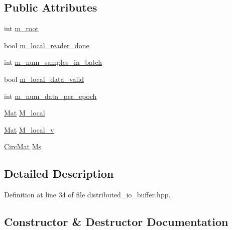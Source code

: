 \subsection*{Public Attributes}
\begin{DoxyCompactItemize}
\item 
int \hyperlink{classlbann_1_1data__buffer_a5d2333dc0a74333b9d8ebfcc8084c783}{m\+\_\+root}
\item 
bool \hyperlink{classlbann_1_1data__buffer_af83d8197ff61c85ab32a612480932a5b}{m\+\_\+local\+\_\+reader\+\_\+done}
\item 
int \hyperlink{classlbann_1_1data__buffer_a5f07c95c2fa99046df6d5437d1ef6375}{m\+\_\+num\+\_\+samples\+\_\+in\+\_\+batch}
\item 
bool \hyperlink{classlbann_1_1data__buffer_ad0c2ff22428f74cf7c8eb4a2be534338}{m\+\_\+local\+\_\+data\+\_\+valid}
\item 
int \hyperlink{classlbann_1_1data__buffer_a14de875712b1362110e41fdd5a3e58a5}{m\+\_\+num\+\_\+data\+\_\+per\+\_\+epoch}
\item 
\hyperlink{base_8hpp_a68f11fdc31b62516cb310831bbe54d73}{Mat} \hyperlink{classlbann_1_1data__buffer_a3d839e04fd26b5810027144662af0e54}{M\+\_\+local}
\item 
\hyperlink{base_8hpp_a68f11fdc31b62516cb310831bbe54d73}{Mat} \hyperlink{classlbann_1_1data__buffer_a850fb59346357e429214d8b384286202}{M\+\_\+local\+\_\+v}
\item 
\hyperlink{base_8hpp_a48abd140bc807a8ac1381efd1bfeb375}{Circ\+Mat} \hyperlink{classlbann_1_1data__buffer_a9c9f68cda527896bc45762ddac7c2e2a}{Ms}
\end{DoxyCompactItemize}


\subsection{Detailed Description}


Definition at line 34 of file distributed\+\_\+io\+\_\+buffer.\+hpp.



\subsection{Constructor \& Destructor Documentation}
\mbox{\label{classlbann_1_1data__buffer_ad03198df8b35ac6349180d5b2bc036d5}} 
